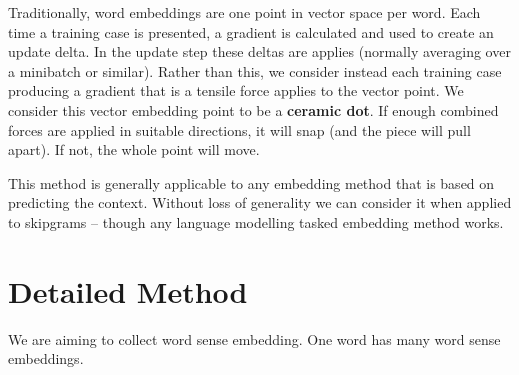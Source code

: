 \documentclass{article}
\begin{document}
Traditionally, word embeddings are one point in vector space per word. Each time a training case is presented, a gradient is calculated and used to create an update delta. In the update step these deltas are applies (normally averaging over a minibatch or similar).
Rather than this, we consider instead each training case producing a gradient that is a tensile force applies to the vector point. We consider this vector embedding point to be a \textbf{ceramic dot}. If enough combined forces are applied in suitable directions, it will snap (and the piece will pull apart). If not, the whole point will move. 

This method is generally applicable to any embedding method that is based on predicting the context. Without loss of generality we can consider it when applied to skipgrams -- though any language modelling tasked embedding method works.

\section{Detailed Method}
We are aiming to collect word sense embedding. One word has many word sense embeddings.
\end{document}
